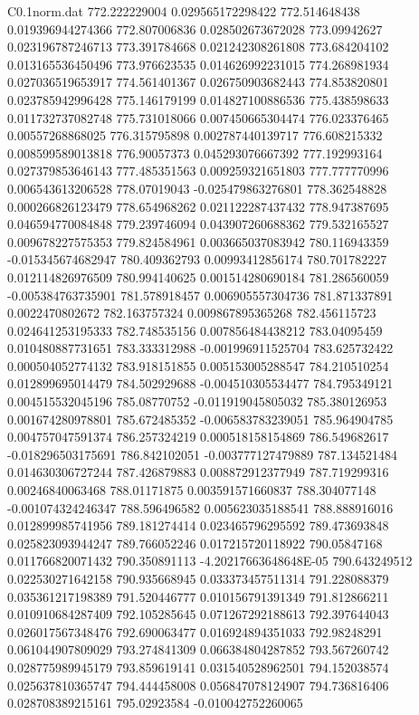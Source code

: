 \begin{filecontents}{C0.1norm.dat}
772.222229004		0.029565172298422
772.514648438		0.019396944274366
772.807006836		0.028502673672028
773.09942627		0.023196787246713
773.391784668		0.021242308261808
773.684204102		0.013165536450496
773.976623535		0.014626992231015
774.268981934		0.027036519653917
774.561401367		0.026750903682443
774.853820801		0.023785942996428
775.146179199		0.014827100886536
775.438598633		0.011732737082748
775.731018066		0.007450665304474
776.023376465		0.00557268868025
776.315795898		0.002787440139717
776.608215332		0.008599589013818
776.90057373		0.045293076667392
777.192993164		0.027379853646143
777.485351563		0.009259321651803
777.777770996		0.006543613206528
778.07019043		-0.025479863276801
778.362548828		0.000266826123479
778.654968262		0.021122287437432
778.947387695		0.046594770084848
779.239746094		0.043907260688362
779.532165527		0.009678227575353
779.824584961		0.003665037083942
780.116943359		-0.015345674682947
780.409362793		0.00993412856174
780.701782227		0.012114826976509
780.994140625		0.001514280690184
781.286560059		-0.005384763735901
781.578918457		0.006905557304736
781.871337891		0.0022470802672
782.163757324		0.009867895365268
782.456115723		0.024641253195333
782.748535156		0.007856484438212
783.04095459		0.010480887731651
783.333312988		-0.001996911525704
783.625732422		0.000504052774132
783.918151855		0.005153005288547
784.210510254		0.012899695014479
784.502929688		-0.004510305534477
784.795349121		0.004515532045196
785.08770752		-0.011919045805032
785.380126953		0.001674280978801
785.672485352		-0.006583783239051
785.964904785		0.004757047591374
786.257324219		0.000518158154869
786.549682617		-0.018296503175691
786.842102051		-0.003777127479889
787.134521484		0.014630306727244
787.426879883		0.008872912377949
787.719299316		0.00246840063468
788.01171875		0.003591571660837
788.304077148		-0.001074324246347
788.596496582		0.005623035188541
788.888916016		0.012899985741956
789.181274414		0.023465796295592
789.473693848		0.025823093944247
789.766052246		0.017215720118922
790.05847168		0.011766820071432
790.350891113		-4.20217663648648E-05
790.643249512		0.022530271642158
790.935668945		0.033373457511314
791.228088379		0.035361217198389
791.520446777		0.010156791391349
791.812866211		0.010910684287409
792.105285645		0.071267292188613
792.397644043		0.026017567348476
792.690063477		0.016924894351033
792.98248291		0.061044907809029
793.274841309		0.066384804287852
793.567260742		0.028775989945179
793.859619141		0.031540528962501
794.152038574		0.025637810365747
794.444458008		0.056847078124907
794.736816406		0.028708389215161
795.02923584		-0.010042752260065

\end{filecontents}
